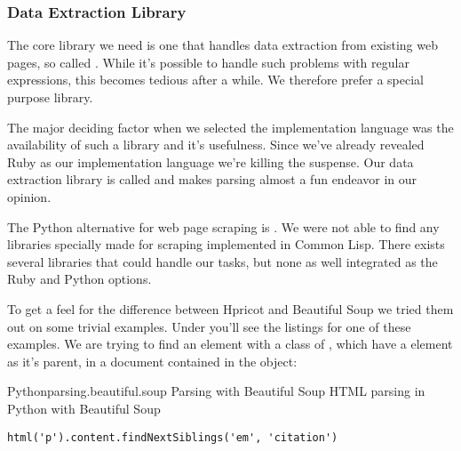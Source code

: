 \subsubsection{Data Extraction Library}

The core library we need is one that handles data extraction from existing
web pages, so called  . While it's possible to
handle such problems with regular expressions, this becomes tedious after a
while. We therefore prefer a special purpose library.

The major deciding factor when we selected the implementation language was
the availability of such a library and it's usefulness. Since we've already
revealed Ruby as our implementation language we're killing the suspense.
Our data extraction library is called %
and makes  parsing almost a fun endeavor in our opinion.

The Python alternative for web page scraping is .
We were not able to find any libraries specially made for  scraping
implemented in Common Lisp. There exists several %
libraries that could handle our tasks, but none as well integrated as
the Ruby and Python options.

To get a feel for the difference between Hpricot and Beautiful Soup we tried
them out on some trivial examples. Under you'll see the listings for one
of these examples. We are trying to find an  element with a class
of , which have a  element as it's parent,
in a  document contained in the  object:

\begin{scode}{Python}{parsing.beautiful.soup}{%
  Parsing with Beautiful Soup}{%
  HTML parsing in Python with Beautiful Soup}
\begin{lstlisting}
html('p').content.findNextSiblings('em', 'citation')
\end{lstlisting}
\end{scode}

